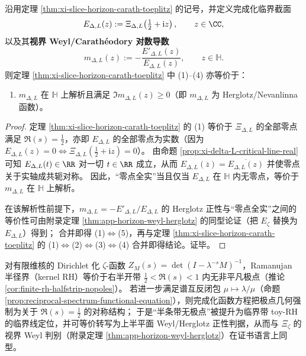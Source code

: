\begin{corollary}\label{cor:xi-slice-weyl-herglotz}
沿用定理 \ref{thm:xi-slice-horizon-carath-toeplitz} 的记号，并定义完成化临界截面
\[
E_{\Delta,L}(z):=\Xi_{\Delta,L}\!\left(\tfrac12+\mathrm{i}z\right),
\qquad z\in\CC,
\]
以及其\textbf{视界 Weyl/Carath\'eodory 对数导数}
\[
m_{\Delta,L}(z):=-\frac{E'_{\Delta,L}(z)}{E_{\Delta,L}(z)},
\qquad z\in\mathbb{H}.
\]
则定理 \ref{thm:xi-slice-horizon-carath-toeplitz} 中 (1)--(4) 亦等价于：
\begin{enumerate}
  \item[(5)] \(m_{\Delta,L}\) 在 \(\mathbb{H}\) 上解析且满足 \(\Im m_{\Delta,L}(z)\ge 0\)（即 \(m_{\Delta,L}\) 为 Herglotz/Nevanlinna 函数）。
\end{enumerate}
\end{corollary}
\begin{proof}
定理 \ref{thm:xi-slice-horizon-carath-toeplitz} 的 (1) 等价于 \(\Xi_{\Delta,L}\) 的全部零点满足 \(\Re(s)=\tfrac12\)，亦即 \(E_{\Delta,L}\) 的全部零点为实数（因为 \(E_{\Delta,L}(z)=0\iff \Xi_{\Delta,L}(\tfrac12+\mathrm{i}z)=0\)）。
由命题 \ref{prop:xi-delta-L-critical-line-real} 可知 \(E_{\Delta,L}(t)\in\RR\) 对一切 \(t\in\RR\) 成立，从而 \(E_{\Delta,L}(\overline z)=\overline{E_{\Delta,L}(z)}\) 并使零点关于实轴成共轭对称。
因此，“零点全实”当且仅当 \(E_{\Delta,L}\) 在 \(\mathbb{H}\) 内无零点，等价于 \(m_{\Delta,L}\) 在 \(\mathbb{H}\) 上解析。
\par
在该解析性前提下，\(m_{\Delta,L}=-E'_{\Delta,L}/E_{\Delta,L}\) 的 Herglotz 正性与“零点全实”之间的等价性可由附录定理 \ref{thm:app-horizon-weyl-herglotz} 的同型论证（把 \(E_{\zeta}\) 替换为 \(E_{\Delta,L}\)）得到；
合并即得 (1)\(\Longleftrightarrow\)(5)，再与定理 \ref{thm:xi-slice-horizon-carath-toeplitz} 的 (1)\(\Longleftrightarrow\)(2)\(\Longleftrightarrow\)(3)\(\Longleftrightarrow\)(4) 合并即得结论。证毕。
\end{proof}

\begin{remark}\label{rem:xi-finite-kernel-ramanujan-herglotz-interface}
对有限维核的 Dirichlet 化 \(\zeta\)-函数 \(Z_M(s)=\det(I-\lambda^{-s}M)^{-1}\)，Ramanujan 半径界（kernel RH）等价于右半开带 \(\tfrac12<\Re(s)<1\) 内无非平凡极点（推论 \ref{cor:finite-rh-halfstrip-nopoles}）。
若进一步满足谱互反闭包 \(\mu\mapsto \lambda/\mu\)（命题 \ref{prop:reciprocal-spectrum-functional-equation}），则完成化函数方程把极点几何强制为关于 \(\Re(s)=\tfrac12\) 的对称结构；
于是“半条带无极点”被提升为临界带 toy-RH 的临界线定位，并可等价转写为上半平面 Weyl/Herglotz 正性判据，从而与 \(\Xi_\zeta\) 的视界 Weyl 判别（附录定理 \ref{thm:app-horizon-weyl-herglotz}）在证书语言上同型。
\end{remark}

